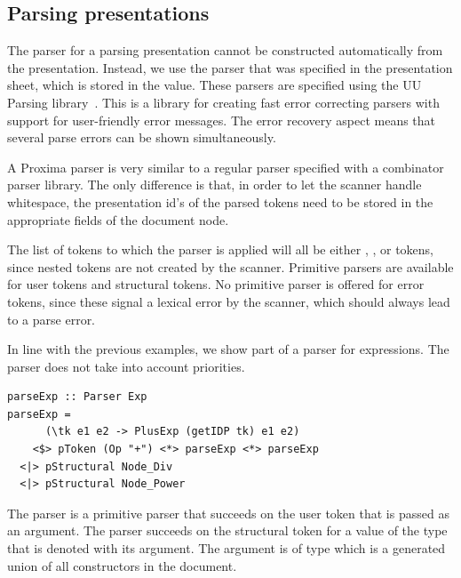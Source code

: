 \documentclass[12pt]{article}
\begin{document}



\subsection{Parsing presentations}

The parser for a parsing presentation cannot be constructed automatically from the presentation. Instead, we use the parser that was specified in the presentation sheet, which is stored in the  value. These parsers are specified using the UU Parsing library~\cite{swierstra03polishParsers, swierstra08parserCombinators}. This is a library for creating fast error correcting parsers with support for user-friendly error messages. The error recovery aspect means that several parse errors can be shown simultaneously.

A Proxima parser is very similar to a regular parser specified with a combinator parser library. The only difference is that, in order to let the scanner handle whitespace, the presentation id's of the parsed tokens need to be stored in the appropriate fields of the document node. 

The list of tokens to which the parser is applied will all be either , , or  tokens, since nested  tokens are not created by the scanner. Primitive parsers are available for user tokens and structural tokens. No primitive parser is offered for error tokens, since these signal a lexical error by the scanner, which should always lead to a parse error.

In line with the previous examples, we show part of a parser for expressions. The parser does not take into account priorities.

\begin{footnotesize}
\begin{verbatim}
parseExp :: Parser Exp
parseExp =
      (\tk e1 e2 -> PlusExp (getIDP tk) e1 e2)
    <$> pToken (Op "+") <*> parseExp <*> parseExp
  <|> pStructural Node_Div
  <|> pStructural Node_Power
\end{verbatim}%
\end{footnotesize}

The  parser is a primitive parser that succeeds on the user token that is passed as an argument. The  parser succeeds on the structural token for a value of the type that is denoted with its argument. The argument is of type  which is a generated union of all constructors in the document. 
\end{document}
